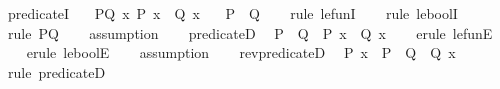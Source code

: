 \begin{isabellebody}
%
\isadelimproof
%
\endisadelimproof
%
\isadelimdocument
%
\endisadelimdocument
%
\isatagdocument
%
\isamarkuptrue%
%
\endisatagdocument
{\isafolddocument}%
%
\isadelimdocument
%
\endisadelimdocument
{}\isamarkupfalse%
\ predicate{}I{\isacharcolon}{\kern0pt}\isanewline
\ \ \ PQ{\isacharcolon}{\kern0pt}\ {\isachardoublequoteopen}{\isasymAnd}x{\isachardot}{\kern0pt}\ P\ x\ {\isasymLongrightarrow}\ Q\ x{\isachardoublequoteclose}\isanewline
\ \ \ {\isachardoublequoteopen}P\ {\isasymle}\ Q{\isachardoublequoteclose}\isanewline
%
\isadelimproof
\ \ %
\endisadelimproof
%
\isatagproof
{}\isamarkupfalse%
\ {\isacharparenleft}{\kern0pt}rule\ le{\isacharunderscore}{\kern0pt}funI{\isacharparenright}{\kern0pt}\isanewline
\ \ \isamarkupfalse%
\ {\isacharparenleft}{\kern0pt}rule\ le{\isacharunderscore}{\kern0pt}boolI{\isacharparenright}{\kern0pt}\isanewline
\ \ \isamarkupfalse%
\ {\isacharparenleft}{\kern0pt}rule\ PQ{\isacharparenright}{\kern0pt}\isanewline
\ \ \isamarkupfalse%
\ assumption\isanewline
\ \ \isamarkupfalse%
%
\endisatagproof
{\isafoldproof}%
%
\isadelimproof
\isanewline
%
\endisadelimproof
\isanewline
{}\isamarkupfalse%
\ predicate{}D{\isacharcolon}{\kern0pt}\isanewline
\ \ {\isachardoublequoteopen}P\ {\isasymle}\ Q\ {\isasymLongrightarrow}\ P\ x\ {\isasymLongrightarrow}\ Q\ x{\isachardoublequoteclose}\isanewline
%
\isadelimproof
\ \ %
\endisadelimproof
%
\isatagproof
{}\isamarkupfalse%
\ {\isacharparenleft}{\kern0pt}erule\ le{\isacharunderscore}{\kern0pt}funE{\isacharparenright}{\kern0pt}\isanewline
\ \ \isamarkupfalse%
\ {\isacharparenleft}{\kern0pt}erule\ le{\isacharunderscore}{\kern0pt}boolE{\isacharparenright}{\kern0pt}\isanewline
\ \ \isamarkupfalse%
\ assumption{\isacharplus}{\kern0pt}\isanewline
\ \ \isamarkupfalse%
%
\endisatagproof
{\isafoldproof}%
%
\isadelimproof
\isanewline
%
\endisadelimproof
\isanewline
{}\isamarkupfalse%
\ rev{\isacharunderscore}{\kern0pt}predicate{}D{\isacharcolon}{\kern0pt}\isanewline
\ \ {\isachardoublequoteopen}P\ x\ {\isasymLongrightarrow}\ P\ {\isasymle}\ Q\ {\isasymLongrightarrow}\ Q\ x{\isachardoublequoteclose}\isanewline
%
\isadelimproof
\ \ %
\endisadelimproof
%
\isatagproof
{}\isamarkupfalse%
\ {\isacharparenleft}{\kern0pt}rule\ predicate{}D{\isacharparenright}{\kern0pt}%

\end{isabellebody}
